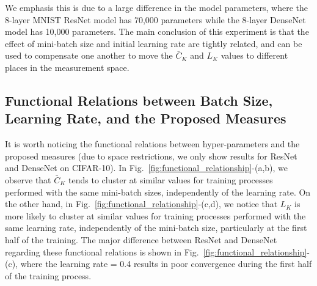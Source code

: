 \documentclass[10pt,journal,compsoc]{IEEEtran}
\begin{document}
We emphasis this is due to a large difference in the model parameters, where the 8-layer MNIST ResNet model has 70,000 parameters while the 8-layer DenseNet model has 10,000 parameters.
The main conclusion of this experiment is that the effect of mini-batch size and initial learning rate are tightly related, and can be used to compensate one another to move the $\bar{C}_K$ and $L_K$ values to different places in the measurement space.



\subsection{Functional Relations between Batch Size, Learning Rate, and the Proposed Measures}

It is worth noticing the functional relations between hyper-parameters and the proposed measures (due to space restrictions, we only show results for ResNet and DenseNet on CIFAR-10). In Fig.~\ref{fig:functional_relationship}-(a,b), we observe that $\bar C_K$ tends to cluster at similar values for training processes performed with the same mini-batch sizes, independently of the learning rate.
On the other hand, in Fig.~\ref{fig:functional_relationship}-(c,d), we notice that $L_K$ is more likely to cluster at similar values for training processes performed with the same learning rate, independently of the mini-batch size, particularly at the first half of the training.
The major difference between ResNet and DenseNet regarding these functional relations is shown in Fig.~\ref{fig:functional_relationship}-(c), where the learning rate = 0.4 results in poor convergence during the first half of the training process.
\end{document}
